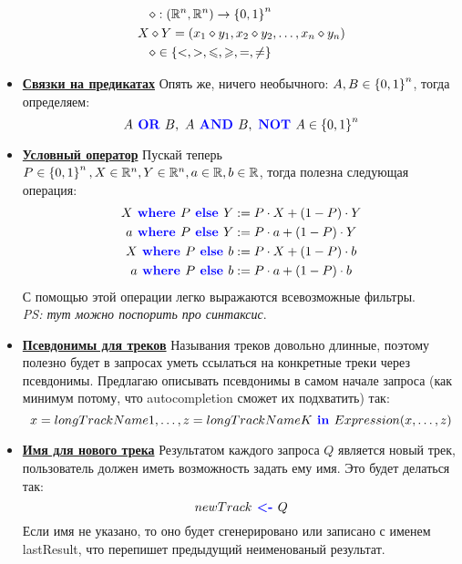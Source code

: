 \begin{itemize}
	\begin{align*}
		&\diamond: \left( \mathbb{R}^n, \mathbb{R}^n \right) \rightarrow \left\lbrace 0, 1 \right\rbrace^n \\
		X &\diamond Y = \left( x_1 \diamond y_1, x_2 \diamond y_2, \ldots, x_n \diamond y_n \right)\\
		&\diamond \in \left\lbrace  <, >, \leqslant, \geqslant, =, \neq  \right\rbrace
	\end{align*}
	\item \textbf{\underline{Связки на предикатах}} Опять же, ничего необычного: $A, B \in \left\lbrace 0, 1 \right\rbrace^n$, тогда определяем:
	\[
		A \text{\textbf{\color{blue}{ OR }}} B,\ A \text{\textbf{\color{blue}{ AND }}} B,\ \text{\textbf{\color{blue}{NOT }}} A \in  \left\lbrace 0, 1 \right\rbrace^n
	\]
	\item \textbf{\underline{Условный оператор}} Пускай теперь $P \in \left\lbrace 0, 1 \right\rbrace^n, X \in \mathbb{R}^n, Y \in \mathbb{R}^n, a \in \mathbb{R}, b \in \mathbb{R}$, тогда полезна следующая операция:
	\begin{align*}
		X \text{\textbf{\color{blue}{ where }}} P \text{\textbf{\color{blue}{ else }}} Y &:= P \cdot X + (1 - P) \cdot Y \\
		a \text{\textbf{\color{blue}{ where }}} P \text{\textbf{\color{blue}{ else }}} Y &:= P \cdot a + (1 - P) \cdot Y \\
		X \text{\textbf{\color{blue}{ where }}} P \text{\textbf{\color{blue}{ else }}} b &:= P \cdot X + (1 - P) \cdot b \\
		a \text{\textbf{\color{blue}{ where }}} P \text{\textbf{\color{blue}{ else }}} b &:= P \cdot a + (1 - P) \cdot b
	\end{align*}
	С помощью этой операции легко выражаются всевозможные фильтры.
	\\\emph{PS: тут можно поспорить про синтаксис}.
	\item \textbf{\underline{Псевдонимы для треков}} Называния треков довольно длинные, поэтому полезно будет в запросах уметь ссылаться на конкретные треки через псевдонимы. Предлагаю описывать псевдонимы в самом начале запроса (как минимум потому, что autocompletion сможет их подхватить) так:
	\[
		x = longTrackName1, \ldots, z = longTrackNameK \text{\textbf{\color{blue}{ in }}} Expression(x, \ldots, z)
	\]
	\item \textbf{\underline{Имя для нового трека}} Результатом каждого запроса $Q$ является новый трек, пользователь должен иметь возможность задать ему имя. Это будет делаться так:
	\[
		newTrack \text{\textbf{\color{blue}{ <- }}} Q
	\]
	Если имя не указано, то оно будет сгенерировано или записано с именем lastResult, что перепишет предыдущий неименованый результат.


\end{itemize}
